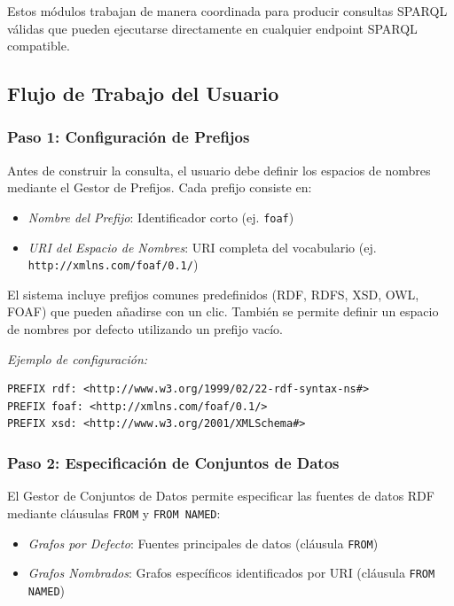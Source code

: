 \documentclass{article}
\begin{document}
Estos módulos trabajan de manera coordinada para producir consultas SPARQL válidas que pueden ejecutarse directamente en cualquier endpoint SPARQL compatible.

\subsection{Flujo de Trabajo del Usuario}
\label{subsec:sparql-workflow}

\subsubsection{Paso 1: Configuración de Prefijos}
\label{subsubsec:prefix-configuration}

Antes de construir la consulta, el usuario debe definir los espacios de nombres mediante el Gestor de Prefijos. Cada prefijo consiste en:

\begin{itemize}
    \item \textit{Nombre del Prefijo}: Identificador corto (ej. \texttt{foaf})
    \item \textit{URI del Espacio de Nombres}: URI completa del vocabulario (ej. \texttt{http://xmlns.com/foaf/0.1/})
\end{itemize}

El sistema incluye prefijos comunes predefinidos (RDF, RDFS, XSD, OWL, FOAF) que pueden añadirse con un clic. También se permite definir un espacio de nombres por defecto utilizando un prefijo vacío.

\textit{Ejemplo de configuración:}
\begin{verbatim}
PREFIX rdf: <http://www.w3.org/1999/02/22-rdf-syntax-ns#>
PREFIX foaf: <http://xmlns.com/foaf/0.1/>
PREFIX xsd: <http://www.w3.org/2001/XMLSchema#>
\end{verbatim}

\subsubsection{Paso 2: Especificación de Conjuntos de Datos}
\label{subsubsec:dataset-specification}

El Gestor de Conjuntos de Datos permite especificar las fuentes de datos RDF mediante cláusulas \texttt{FROM} y \texttt{FROM NAMED}:

\begin{itemize}
    \item \textit{Grafos por Defecto}: Fuentes principales de datos (cláusula \texttt{FROM})
    \item \textit{Grafos Nombrados}: Grafos específicos identificados por URI (cláusula \texttt{FROM NAMED})
\end{itemize}
\end{document}
